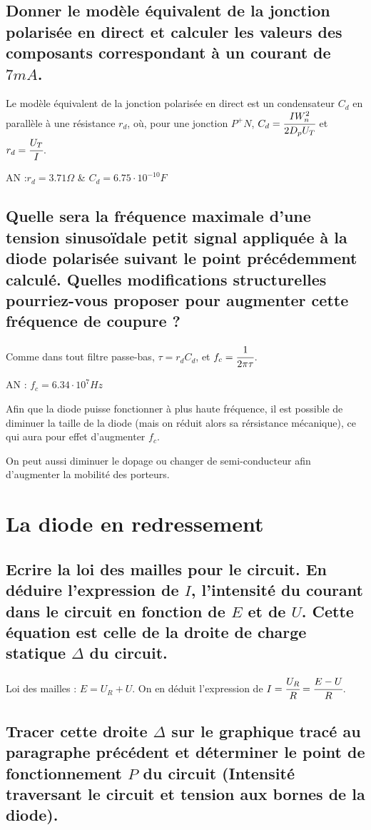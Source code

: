 \documentclass[10pt]{article}
\begin{document}
  \subsection{Donner le modèle équivalent de la jonction polarisée en direct et calculer les valeurs des composants correspondant à un courant de $7 mA$.}
  Le modèle équivalent de la jonction polarisée en direct est un condensateur $C_d$ en parallèle à une résistance $r_d$, où, pour une jonction $P^+N$, $C_d = \cfrac{I W_n^2}{2 D_p U_T}$ et $r_d = \cfrac{U_T}{I}$.

  AN :$r_d = 3.71 \Omega$ \& $C_d = 6.75\cdot 10^{-10}F$
  
  \subsection{Quelle sera la fréquence maximale d’une tension sinusoïdale petit signal appliquée à la diode polarisée suivant le point précédemment calculé. Quelles modifications structurelles pourriez-vous proposer pour augmenter cette fréquence de coupure ?}
  Comme dans tout filtre passe-bas, $\tau = r_d C_d$, et $f_c = \cfrac{1}{2\pi\tau}$.

  AN : $f_c = 6.34\cdot 10^7Hz$

  Afin que la diode puisse fonctionner à plus haute fréquence, il est possible de diminuer la taille de la diode (mais on réduit alors sa rérsistance mécanique), ce qui aura pour effet d'augmenter $f_c$.

  On peut aussi diminuer le dopage ou changer de semi-conducteur afin d'augmenter la mobilité des porteurs.

 \section{La diode en redressement}
  \subsection{Ecrire la loi des mailles pour le circuit. En déduire l’expression de $I$, l’intensité du courant dans le circuit en fonction de $E$ et de $U$. Cette équation est celle de la droite de charge statique $\Delta$ du circuit.}
   Loi des mailles : $E = U_R + U$. On en déduit l'expression de $I = \cfrac{U_R}{R} = \cfrac{E-U}{R}$.

  \subsection{Tracer cette droite $\Delta$ sur le graphique tracé au paragraphe précédent et déterminer le point de fonctionnement $P$ du circuit (Intensité traversant le circuit et tension aux bornes de la diode).}
\end{document}
